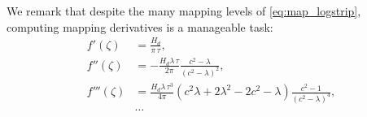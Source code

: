 \documentclass[internal]{sintefmemo}
\newcommand{\mr}{\mathrm}
\newcommand{\ii}{\mr{i}\,}
\newcommand{\ee}{\mr{e}}
\renewcommand{\_}[1]{_\mr{#1}}
\newcommand{\h}{\hat}
\newcommand{\rbr}[1]{\left(#1\right)}
\newcommand{\zz}{\zeta}
\newcommand{\kk}{\kappa}
\newcommand{\ww}{\omega}
\begin{document}
We remark that despite the many mapping levels of \eqref{eq:map_logstrip}, computing mapping derivatives is a manageable task:
\begin{equation}
\begin{aligned}
f'(\zz) &= \frac{H_d}{\pi\, \tau},  \\
f''(\zz) &=- \frac{H_d \lambda\, \tau}{2\pi} \frac{c^2-\lambda}{\rbr{c^2-\lambda}^2},\\
f'''(\zz) &= \frac{H_d \lambda\, \tau^3}{4\pi} \rbr{c^2\lambda + 2\lambda^2 - 2c^2-\lambda} \frac{c^2-1}{\rbr{c^2-\lambda}^4},\\
&\ldots
\end{aligned}
\label{eq:}
\end{equation}




\end{document}
